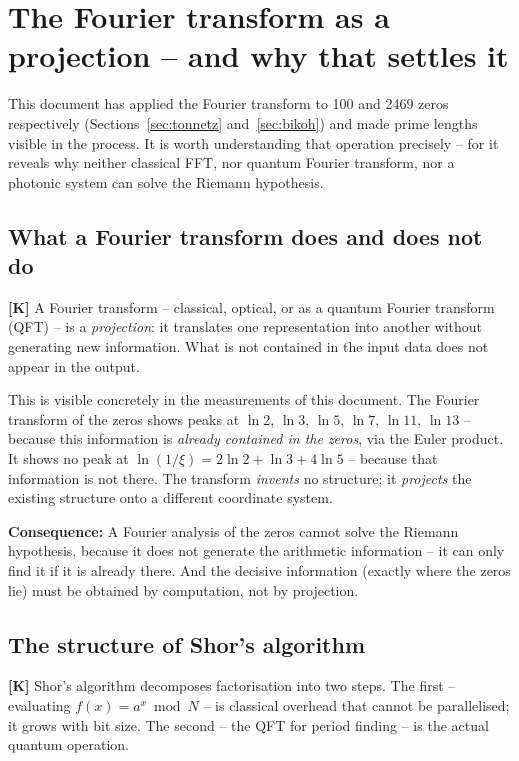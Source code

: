\section{The Fourier transform as a projection -- and why that settles it}
\label{sec:projektion}

This document has applied the Fourier transform to 100 and 2469 zeros
respectively (Sections~\ref{sec:tonnetz} and~\ref{sec:bikoh}) and made
prime lengths visible in the process. It is worth understanding that
operation precisely -- for it reveals why neither classical FFT, nor
quantum Fourier transform, nor a photonic system can solve the Riemann
hypothesis.

\subsection{What a Fourier transform does and does not do}

\textbf{[K]} A Fourier transform -- classical, optical, or as a quantum
Fourier transform (QFT) -- is a \emph{projection}: it translates one
representation into another without generating new information. What is not
contained in the input data does not appear in the output.

This is visible concretely in the measurements of this document. The
Fourier transform of the zeros shows peaks at $\ln 2$, $\ln 3$, $\ln 5$,
$\ln 7$, $\ln 11$, $\ln 13$ -- because this information is \emph{already
contained in the zeros}, via the Euler product. It shows no peak at
$\ln(1/\xi) = 2\ln2+\ln3+4\ln5$ -- because that information is not there.
The transform \emph{invents} no structure; it \emph{projects} the existing
structure onto a different coordinate system.

\textbf{Consequence:} A Fourier analysis of the zeros cannot solve the
Riemann hypothesis, because it does not generate the arithmetic
information -- it can only find it if it is already there. And the decisive
information (exactly where the zeros lie) must be obtained by computation,
not by projection.

\subsection{The structure of Shor's algorithm}

\textbf{[K]} Shor's algorithm decomposes factorisation into two steps.
The first -- evaluating $f(x) = a^x \bmod N$ -- is classical overhead that
cannot be parallelised; it grows with bit size. The second -- the QFT for
period finding -- is the actual quantum operation.

